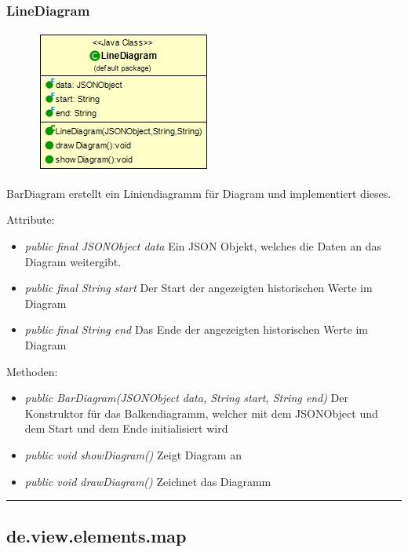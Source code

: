 \subsubsection{LineDiagram}
\begin{minipage}{0.3\textwidth}
    \begin{figure}[H]
        {\centering\includegraphics[scale = 0.5
        ]{media/view/diagram/LineDiagram_Class.png}}
    \end{figure}
    \end{minipage} \hfill
    \begin{minipage}{0.6\textwidth}
BarDiagram erstellt ein Liniendiagramm für Diagram und implementiert dieses.
\end{minipage}
Attribute: \begin{itemize} [noitemsep]
    \item \emph{public final JSONObject data} Ein JSON Objekt, welches die Daten an das Diagram weitergibt.
    \item \emph{public final String start} Der Start der angezeigten historischen Werte im Diagram
    \item \emph{public final String end} Das Ende der angezeigten historischen Werte im Diagram
\end{itemize}
Methoden: \begin{itemize} [noitemsep]
    \item \emph{public BarDiagram(JSONObject data, String start, String end)} Der Konstruktor für das Balkendiagramm, welcher mit dem JSONObject und dem Start und dem Ende initialisiert wird
    \item \emph{public void showDiagram()} Zeigt Diagram an
    \item \emph{public void drawDiagram()} Zeichnet das Diagramm
\end{itemize}

\rule{\textwidth}{0.4pt}
\subsection{de.view.elements.map}

